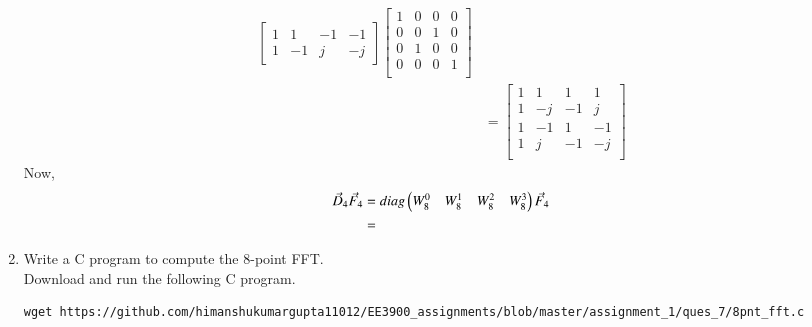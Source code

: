\documentclass[journal,12pt,twocolumn]{IEEEtran}
\renewcommand\thesection{\arabic{section}}
\begin{document}
\begin{enumerate}[label=\arabic*.,ref=\thesection.\theenumi]
\begin{align}
\begin{bmatrix}
                                  1 & 1  & -1 & -1 \\
                                  1 & -1 & j  & -j
                             \end{bmatrix}\begin{bmatrix}
                                               1 & 0 & 0 & 0 \\
                                               0 & 0 & 1 & 0 \\
                                               0 & 1 & 0 & 0 \\
                                               0 & 0 & 0 & 1 \\
                                          \end{bmatrix}           \\
                          & =\begin{bmatrix}
                                  1 & 1  & 1  & 1  \\
                                  1 & -j & -1 & j  \\
                                  1 & -1 & 1  & -1 \\
                                  1 & j  & -1 & -j \\
                             \end{bmatrix}
           \end{align}
           Now,
           \begin{align}
                \vec{D}_{4}\vec{F}_{4} & =diag\begin{pmatrix}W_{8}^{0} & W_{8}^{1} & W_{8}^{2} & W_{8}^{3}\end{pmatrix}\vec{F}_{4} \\
                                       & =
           \end{align}
     \item Write a C program to compute the 8-point FFT. \\
           \solution Download and run the following C program.
           \begin{lstlisting}
wget https://github.com/himanshukumargupta11012/EE3900_assignments/blob/master/assignment_1/ques_7/8pnt_fft.c
           \end{lstlisting}
\end{enumerate}
\end{document}
